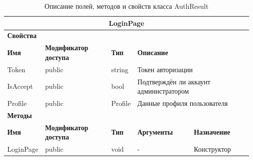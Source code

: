 \documentclass{../includes/TechDoc}
\begin{document}
    \begin{table}[ht]
        \caption{\label{tab:class-authresult-table}Описание полей, методов и свойств класса AuthResult}
        \centering
        \begin{tabular}{|l|p{3cm}|l|p{3cm}|p{5cm}|}
            \hline
            \multicolumn{5}{|c|}{LoginPage} \\ \hline
            \multicolumn{5}{|l|}{\textbf{Свойства}} \\ \hline
            \textbf{Имя} & \textbf{Модификатор доступа} & \textbf{Тип} & \multicolumn{2}{l|}{\textbf{Описание}} \\ \hline
            Token & public & string & \multicolumn{2}{l|}{Токен авторизации} \\ \hline
            IsAccept & public & bool & \multicolumn{2}{l|}{Подтверждён ли аккаунт администратором} \\ \hline
            Profile & public & Profile & \multicolumn{2}{l|}{Данные профиля пользователя} \\ \hline
            \multicolumn{5}{|l|}{\textbf{Методы}} \\ \hline
            \textbf{Имя} & \textbf{Модификатор доступа} & \textbf{Тип} & \textbf{Аргументы} & \textbf{Назначение} \\ \hline
            LoginPage & public & void & - & Конструктор \\ \hline
        \end{tabular}
    \end{table}

    \newpage
\end{document}
